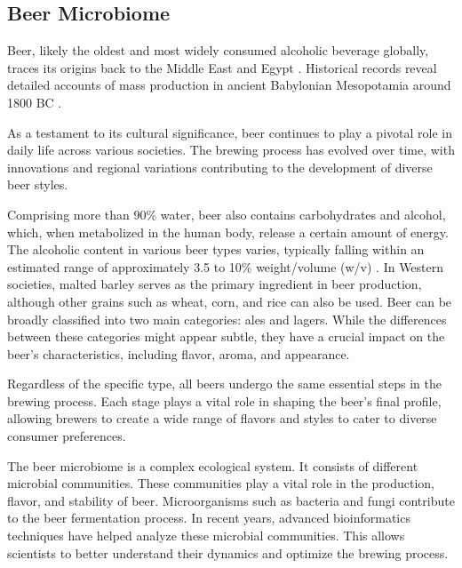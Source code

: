     
    
    
    
    
    \subsection{Beer Microbiome}
        Beer, likely the oldest and most widely consumed alcoholic beverage globally, traces its origins back to the Middle East and Egypt \cite{bamforth2000brief}. Historical records reveal detailed accounts of mass production in ancient Babylonian Mesopotamia around 1800 BC \cite{preedy2011beer}.
    
        As a testament to its cultural significance, beer continues to play a pivotal role in daily life across various societies. The brewing process has evolved over time, with innovations and regional variations contributing to the development of diverse beer styles.
    
        Comprising more than 90\% water, beer also contains carbohydrates and alcohol, which, when metabolized in the human body, release a certain amount of energy. The alcoholic content in various beer types varies, typically falling within an estimated range of approximately 3.5 to 10\% weight/volume (w/v) \cite{de2016effects}. In Western societies, malted barley serves as the primary ingredient in beer production, although other grains such as wheat, corn, and rice can also be used. Beer can be broadly classified into two main categories: ales and lagers. While the differences between these categories might appear subtle, they have a crucial impact on the beer's characteristics, including flavor, aroma, and appearance.
                
        Regardless of the specific type, all beers undergo the same essential steps in the brewing process. Each stage plays a vital role in shaping the beer's final profile, allowing brewers to create a wide range of flavors and styles to cater to diverse consumer preferences.


            The beer microbiome is a complex ecological system. It consists of different microbial communities. These communities play a vital role in the production, flavor, and stability of beer. Microorganisms such as bacteria and fungi contribute to the beer fermentation process. In recent years, advanced bioinformatics techniques have helped analyze these microbial communities. This allows scientists to better understand their dynamics and optimize the brewing process.
                    
